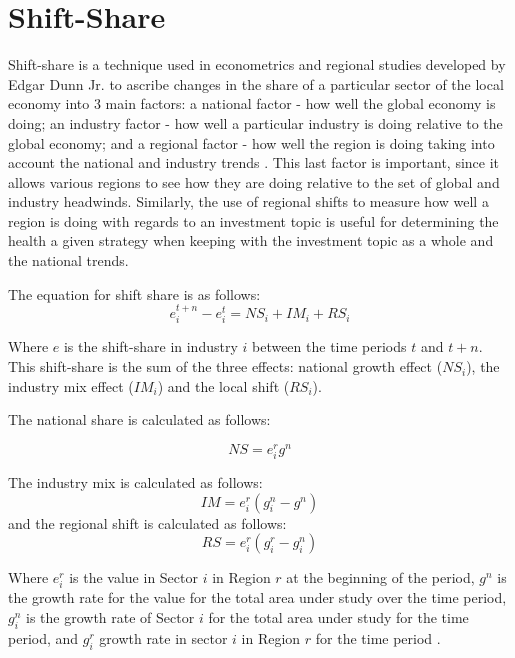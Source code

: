 \section{Shift-Share}

Shift-share is a technique used in econometrics and regional studies developed by Edgar Dunn Jr. to ascribe changes in the share of a particular sector of the local economy into 3 main factors: a national factor - how well the global economy is doing; an industry factor - how well a particular industry is doing relative to the global economy; and a regional factor - how well the region is doing taking into account the national and industry trends \citep{dunn1960statistical}.   This last factor is important, since it allows various regions to see how they are doing relative to the set of global and industry headwinds.  Similarly, the use of regional shifts to measure how well a region is doing with regards to an investment topic is useful for determining the health a given strategy  when keeping with the investment topic as a whole and the national trends. 

The equation for shift share is as follows:
\begin{equation}
   e^{t+n}_{i} - e^{t}_{i} = NS_{i} + IM_{i} + RS_{i}
    \label{Eq:Shft_share}
\end{equation}

Where $e$ is the shift-share in industry $i$ between the time periods $t$ and $t+n$.  This shift-share is the sum of the three effects: national growth effect ($NS_{i}$), the industry mix effect ($IM_{i}$) and the local shift ($RS_{i}$). 

The national share is calculated as follows:

\begin{equation}
    NS = e^{r}_{i}g^{n}
    \label{Eq:NationalShare}
\end{equation}

The industry mix is calculated as follows:
\begin{equation}
    IM = e^{r}_{i}(g^{n}_{i} - g^{n})
    \label{Eq:IndustryMix}
\end{equation}
and the regional shift is calculated as follows: 
\begin{equation}
    RS =  e^{r}_{i}(g^{r}_{i} - g^{n}_{i})
    \label{Eq:RegionalShare}
\end{equation}

Where $e^{r}_{i}$ is the value in Sector $i$ in Region $r$ at the beginning of the period, $g^{n}$ is the growth rate for the value for the total area under study over the time period, $g^{n}_{i}$ is the growth rate of Sector $i$ for the total area under study for the time period, and $g^{r}_{i}$ growth rate in sector $i$ in Region $r$ for the time period \citep{Houston67}. 

